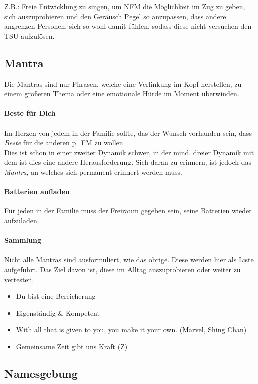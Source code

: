 Z.B.: Freie Entwicklung zu singen, um NFM die Möglichkeit im Zug zu geben, sich auszuprobieren und den Geräusch Pegel so anzupassen, dass andere angrenzen Personen, sich so wohl damit fühlen, sodass diese nicht versuchen den TSU aufzulösen.

\subsection{Mantra}
Die Mantras sind nur Phrasen, welche eine Verlinkung im Kopf herstellen, zu einem größeren Thema oder eine emotionale Hürde im Moment überwinden.


\paragraph{Beste für Dich}
Im Herzen von jedem in der Familie sollte, das der Wunsch vorhanden sein, dass \textit{Beste} für die anderen \gls{p_FM} zu wollen.\\

Dies ist schon in einer zweiter Dynamik schwer, in der mind. dreier Dynamik mit dem  ist dies eine andere Herausforderung. Sich daran zu erinnern, ist jedoch das \textit{Mantra}, an welches sich permanent erinnert werden muss.

\paragraph{Batterien aufladen} Für jeden in der Familie muss der Freiraum gegeben sein, seine Batterien wieder aufzuladen.

\paragraph{Sammlung} 
Nicht alle Mantras sind ausformuliert, wie das obrige. Diese werden hier als Liste aufgeführt. Das Ziel davon ist, diese im Alltag auszuprobieren oder weiter zu vertesten. 

\begin{itemize}
	\item Du bist eine Bereicherung
	\item Eigenständig $\&$ Kompetent
	\item With all that is given to you, you make it your own. (Marvel, Shing Chan)
	\item Gemeinsame Zeit gibt uns Kraft (Z)
\end{itemize}

\subsection{Namesgebung}

